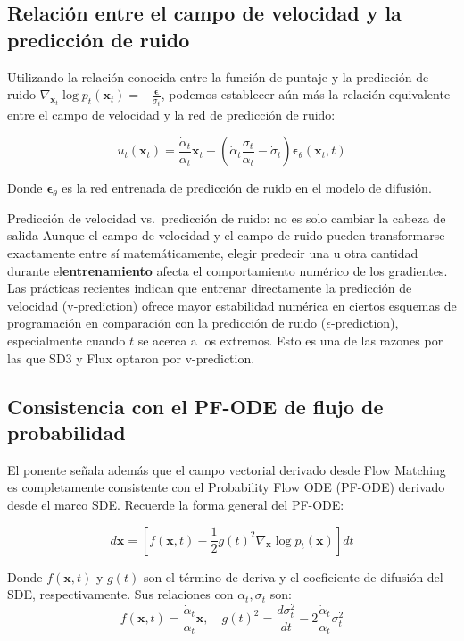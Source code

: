 \documentclass[a4paper]{article}
\begin{document}
\subsection{Relación entre el campo de velocidad y la predicción de ruido}

Utilizando la relación conocida entre la función de puntaje y la predicción de ruido $\nabla_{\mathbf{x}_t} \log p_t(\mathbf{x}_t) = -\frac{\boldsymbol{\epsilon}}{\sigma_t}$, podemos establecer aún más la relación equivalente entre el campo de velocidad y la red de predicción de ruido:

$$u_t(\mathbf{x}_t) = \frac{\dot{\alpha}_t}{\alpha_t} \mathbf{x}_t - \left(\dot{\alpha}_t \frac{\sigma_t}{\alpha_t} - \dot{\sigma}_t\right) \boldsymbol{\epsilon}_\theta(\mathbf{x}_t, t)$$

Donde $\boldsymbol{\epsilon}_\theta$ es la red entrenada de predicción de ruido en el modelo de difusión.

\begin{warningbox}{Predicción de velocidad vs.\ predicción de ruido: no es solo cambiar la cabeza de salida}
Aunque el campo de velocidad y el campo de ruido pueden transformarse exactamente entre sí matemáticamente, elegir predecir una u otra cantidad durante el\textbf{entrenamiento} afecta el comportamiento numérico de los gradientes. Las prácticas recientes indican que entrenar directamente la predicción de velocidad (v-prediction) ofrece mayor estabilidad numérica en ciertos esquemas de programación en comparación con la predicción de ruido ($\epsilon$-prediction), especialmente cuando $t$ se acerca a los extremos. Esto es una de las razones por las que SD3 y Flux optaron por v-prediction.
\end{warningbox}

\subsection{Consistencia con el PF-ODE de flujo de probabilidad}

El ponente señala además que el campo vectorial derivado desde Flow Matching es completamente consistente con el Probability Flow ODE (PF-ODE) derivado desde el marco SDE. Recuerde la forma general del PF-ODE:

$$d\mathbf{x} = \left[f(\mathbf{x}, t) - \frac{1}{2}g(t)^2 \nabla_\mathbf{x} \log p_t(\mathbf{x})\right] dt$$

Donde $f(\mathbf{x}, t)$ y $g(t)$ son el término de deriva y el coeficiente de difusión del SDE, respectivamente. Sus relaciones con $\alpha_t, \sigma_t$ son:
$$f(\mathbf{x}, t) = \frac{\dot{\alpha}_t}{\alpha_t} \mathbf{x}, \quad g(t)^2 = \frac{d\sigma_t^2}{dt} - 2\frac{\dot{\alpha}_t}{\alpha_t}\sigma_t^2$$
\end{document}
